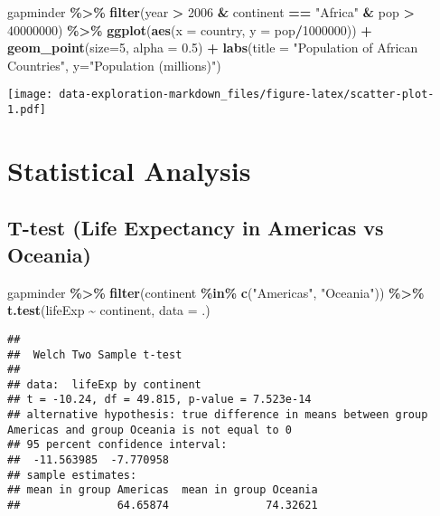 \documentclass[
]{article}
\newenvironment{Shaded}{\begin{snugshade}}{\end{snugshade}}
\newcommand{\AttributeTok}[1]{\textcolor[rgb]{0.13,0.29,0.53}{#1}}
\newcommand{\DecValTok}[1]{\textcolor[rgb]{0.00,0.00,0.81}{#1}}
\newcommand{\FloatTok}[1]{\textcolor[rgb]{0.00,0.00,0.81}{#1}}
\newcommand{\FunctionTok}[1]{\textcolor[rgb]{0.13,0.29,0.53}{\textbf{#1}}}
\newcommand{\NormalTok}[1]{#1}
\newcommand{\SpecialCharTok}[1]{\textcolor[rgb]{0.81,0.36,0.00}{\textbf{#1}}}
\newcommand{\StringTok}[1]{\textcolor[rgb]{0.31,0.60,0.02}{#1}}
\begin{document}
\begin{Shaded}
\begin{Highlighting}[]
\NormalTok{gapminder }\SpecialCharTok{\%\textgreater{}\%} 
  \FunctionTok{filter}\NormalTok{(year }\SpecialCharTok{\textgreater{}} \DecValTok{2006} \SpecialCharTok{\&}\NormalTok{ continent }\SpecialCharTok{==} \StringTok{"Africa"} \SpecialCharTok{\&}\NormalTok{ pop }\SpecialCharTok{\textgreater{}} \DecValTok{40000000}\NormalTok{) }\SpecialCharTok{\%\textgreater{}\%} 
  \FunctionTok{ggplot}\NormalTok{(}\FunctionTok{aes}\NormalTok{(}\AttributeTok{x =}\NormalTok{ country, }\AttributeTok{y =}\NormalTok{ pop}\SpecialCharTok{/}\DecValTok{1000000}\NormalTok{)) }\SpecialCharTok{+} 
  \FunctionTok{geom\_point}\NormalTok{(}\AttributeTok{size=}\DecValTok{5}\NormalTok{, }\AttributeTok{alpha =} \FloatTok{0.5}\NormalTok{) }\SpecialCharTok{+}
  \FunctionTok{labs}\NormalTok{(}\AttributeTok{title =} \StringTok{"Population of African Countries"}\NormalTok{, }\AttributeTok{y=}\StringTok{"Population (millions)"}\NormalTok{)}
\end{Highlighting}
\end{Shaded}

\texttt{[image: data-exploration-markdown\_files/figure-latex/scatter-plot-1.pdf]}

\section{Statistical Analysis}\label{statistical-analysis}

\subsection{T-test (Life Expectancy in Americas vs
Oceania)}\label{t-test-life-expectancy-in-americas-vs-oceania}

\begin{Shaded}
\begin{Highlighting}[]
\NormalTok{gapminder }\SpecialCharTok{\%\textgreater{}\%} 
  \FunctionTok{filter}\NormalTok{(continent }\SpecialCharTok{\%in\%} \FunctionTok{c}\NormalTok{(}\StringTok{"Americas"}\NormalTok{, }\StringTok{"Oceania"}\NormalTok{)) }\SpecialCharTok{\%\textgreater{}\%}  
  \FunctionTok{t.test}\NormalTok{(lifeExp }\SpecialCharTok{\textasciitilde{}}\NormalTok{ continent, }\AttributeTok{data =}\NormalTok{ .)}
\end{Highlighting}
\end{Shaded}

\begin{verbatim}
## 
##  Welch Two Sample t-test
## 
## data:  lifeExp by continent
## t = -10.24, df = 49.815, p-value = 7.523e-14
## alternative hypothesis: true difference in means between group Americas and group Oceania is not equal to 0
## 95 percent confidence interval:
##  -11.563985  -7.770958
## sample estimates:
## mean in group Americas  mean in group Oceania 
##               64.65874               74.32621
\end{verbatim}
\end{document}
